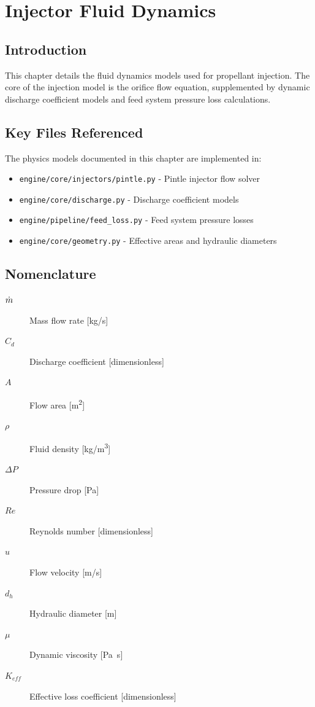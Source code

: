 \section{Injector Fluid Dynamics}

\subsection{Introduction}
This chapter details the fluid dynamics models used for propellant injection. The core of the injection model is the orifice flow equation, supplemented by dynamic discharge coefficient models and feed system pressure loss calculations.

\subsection{Key Files Referenced}
The physics models documented in this chapter are implemented in:
\begin{itemize}
    \item \texttt{engine/core/injectors/pintle.py} - Pintle injector flow solver
    \item \texttt{engine/core/discharge.py} - Discharge coefficient models
    \item \texttt{engine/pipeline/feed_loss.py} - Feed system pressure losses
    \item \texttt{engine/core/geometry.py} - Effective areas and hydraulic diameters
\end{itemize}

\subsection{Nomenclature}
\begin{description}
    \item[\(\dot{m}\)] Mass flow rate [\si{kg/s}]
    \item[\(C_d\)] Discharge coefficient [dimensionless]
    \item[\(A\)] Flow area [\si{m^2}]
    \item[\(\rho\)] Fluid density [\si{kg/m^3}]
    \item[\(\Delta P\)] Pressure drop [\si{Pa}]
    \item[\(Re\)] Reynolds number [dimensionless]
    \item[\(u\)] Flow velocity [\si{m/s}]
    \item[\(d_h\)] Hydraulic diameter [\si{m}]
    \item[\(\mu\)] Dynamic viscosity [\si{Pa.s}]
    \item[\(K_{eff}\)] Effective loss coefficient [dimensionless]
\end{description}

